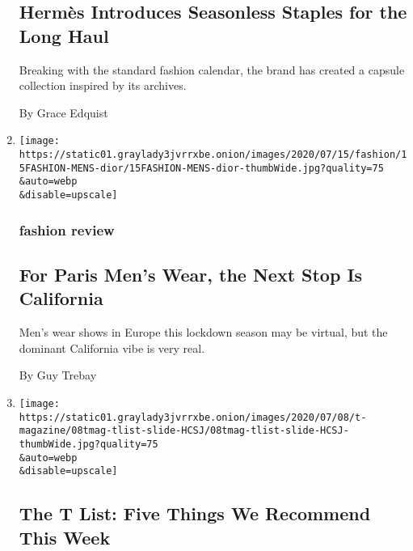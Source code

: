 \begin{enumerate}
  \hypertarget{hermuxe8s-introduces-seasonless-staples-for-the-long-haul}{%
  \subsection{Hermès Introduces Seasonless Staples for the Long
  Haul}\label{hermuxe8s-introduces-seasonless-staples-for-the-long-haul}}

  Breaking with the standard fashion calendar, the brand has created a
  capsule collection inspired by its archives.

  By Grace Edquist
\item
  \href{/2020/07/15/style/mens-fashion-for-paris-mens-wear-next-stop-california.html}{}

  \texttt{[image: https://static01.graylady3jvrrxbe.onion/images/2020/07/15/fashion/15FASHION-MENS-dior/15FASHION-MENS-dior-thumbWide.jpg?quality=75\\\&auto=webp\\\&disable=upscale]}

  \hypertarget{fashion-review-1}{%
  \subsubsection{fashion review}\label{fashion-review-1}}

  \hypertarget{for-paris-mens-wear-the-next-stop-is-california}{%
  \subsection{For Paris Men's Wear, the Next Stop Is
  California}\label{for-paris-mens-wear-the-next-stop-is-california}}

  Men's wear shows in Europe this lockdown season may be virtual, but
  the dominant California vibe is very real.

  By Guy Trebay
\item
  \href{/2020/07/09/t-magazine/robert-longo-quarantine-films.html}{}

  \texttt{[image: https://static01.graylady3jvrrxbe.onion/images/2020/07/08/t-magazine/08tmag-tlist-slide-HCSJ/08tmag-tlist-slide-HCSJ-thumbWide.jpg?quality=75\\\&auto=webp\\\&disable=upscale]}

  \hypertarget{the-t-list-five-things-we-recommend-this-week-2}{%
  \subsection{The T List: Five Things We Recommend This
  Week}\label{the-t-list-five-things-we-recommend-this-week-2}}


\end{enumerate}
